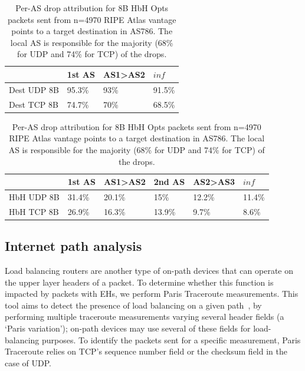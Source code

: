 \documentclass[conference]{IEEEtran}
\begin{document}
\begin{table}
\centering
\caption{Per-AS drop attribution for 8B Dest Opts packets sent from n=4970 RIPE Atlas vantage points to a target destination in AS786. The local AS is responsible for the majority (5\% for UDP and 25\% for TCP) of the drops.}
 \label{tbl:uk_as1}

\begin{tabular}{l|l|l|l}
                                   & 1st AS & AS1\textgreater AS2 & $inf $     \\ \hline 

{Dest UDP 8B} & 95.3\% & 93\%                 & 91.5\% \\ \hline

{Dest TCP 8B} & 74.7\% & 70\%                 & 68.5\%
\end{tabular}
\bigskip
\caption{Per-AS drop attribution for 8B HbH Opts packets sent from n=4970 RIPE Atlas vantage points to a target destination in AS786. The local AS is responsible for the majority (68\% for UDP and 74\% for TCP) of the drops.}
\begin{tabular}{p{}|l|l|l|l|l}

              & 1st AS & AS1\textgreater{}AS2 & 2nd AS & AS2\textgreater{}AS3 & $inf$     \\ \hline
HbH UDP 8B & 31.4\% & 20.1\%               & 15\%   & 12.2\%               & 11.4\% \\ \hline
HbH TCP 8B & 26.9\% & 16.3\%               & 13.9\% & 9.7\%                & 8.6\%  \\ 
\end{tabular}
 \label{tbl:uk_as2}
\end{table}


\subsection{Internet path analysis}

Load balancing routers are another type of on-path devices that can operate on the upper layer headers of a packet. To determine whether this function is impacted by packets with EHs, we perform Paris Traceroute measurements. This tool aims to detect the presence of load balancing on a given path~\cite{augustin2006avoiding}, by performing multiple traceroute measurements varying several header fields (a `Paris variation'); on-path devices may use several of these fields for load-balancing purposes. To identify the packets sent for a specific measurement, Paris Traceroute relies on  TCP's sequence number field or the checksum field in the case of UDP.
\end{document}
